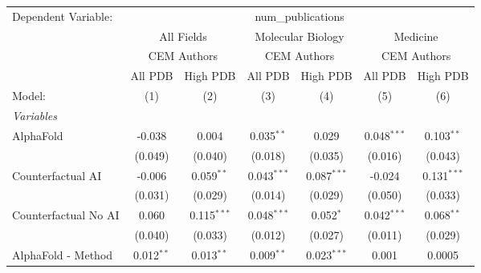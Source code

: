 \begingroup
\centering
\begin{tabular}{lcccccc}
   \tabularnewline \midrule \midrule
   Dependent Variable: & \multicolumn{6}{c}{num\_publications}\\
 & \multicolumn{2}{c}{All Fields} & \multicolumn{2}{c}{Molecular Biology} & \multicolumn{2}{c}{Medicine} \\
\cmidrule(lr){2-3} \cmidrule(lr){4-5} \cmidrule(lr){6-7}
 & \multicolumn{2}{c}{CEM Authors} & \multicolumn{2}{c}{CEM Authors} & \multicolumn{2}{c}{CEM Authors} \\
\cmidrule(lr){2-3} \cmidrule(lr){4-5} \cmidrule(lr){6-7}
 & \multicolumn{1}{c}{All PDB} & \multicolumn{1}{c}{High PDB} & \multicolumn{1}{c}{All PDB} & \multicolumn{1}{c}{High PDB} & \multicolumn{1}{c}{All PDB} & \multicolumn{1}{c}{High PDB} \\
\cmidrule(lr){2-2} \cmidrule(lr){3-3} \cmidrule(lr){4-4} \cmidrule(lr){5-5} \cmidrule(lr){6-6} \cmidrule(lr){7-7}
   Model:                                                     & (1)            & (2)           & (3)           & (4)            & (5)           & (6)\\  
   \midrule
   \emph{Variables}\\
   AlphaFold                                                  & -0.038         & 0.004         & 0.035$^{**}$  & 0.029          & 0.048$^{***}$ & 0.103$^{**}$\\   
                                                              & (0.049)        & (0.040)       & (0.018)       & (0.035)        & (0.016)       & (0.043)\\   
   Counterfactual AI                                          & -0.006         & 0.059$^{**}$  & 0.043$^{***}$ & 0.087$^{***}$  & -0.024        & 0.131$^{***}$\\   
                                                              & (0.031)        & (0.029)       & (0.014)       & (0.029)        & (0.050)       & (0.033)\\   
   Counterfactual No AI                                       & 0.060          & 0.115$^{***}$ & 0.048$^{***}$ & 0.052$^{*}$    & 0.042$^{***}$ & 0.068$^{**}$\\   
                                                              & (0.040)        & (0.033)       & (0.012)       & (0.027)        & (0.011)       & (0.029)\\   
   AlphaFold - Method                                         & 0.012$^{**}$   & 0.013$^{**}$  & 0.009$^{**}$  & 0.023$^{***}$  & 0.001         & 0.0005\\   

\end{tabular}
